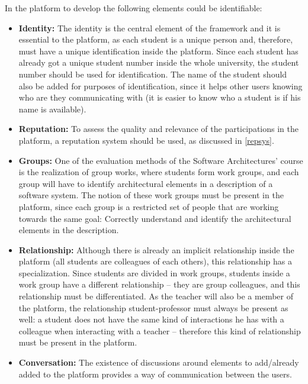 In the platform to develop the following elements could be identifiable:

\begin{itemize}
\item \textbf{Identity:} The identity is the central element of the framework and it is essential to the platform, as each student is a unique person and, therefore, must have a unique identification inside the platform. Since each student has already got a unique student number inside the whole university, the student number should be used for identification. The name of the student should also be added for purposes of identification, since it helps other users knowing who are they communicating with (it is easier to know who a student is if his name is available).

\item \textbf{Reputation:} To assess the quality and relevance of the participations in the platform, a reputation system should be used, as discussed in \ref{repsys}.

\item \textbf{Groups:} One of the evaluation methods of the Software Architectures' course is the realization of group works, where students form work groups, and each group will have to identify architectural elements in a description of a software system. The notion of these work groups must be present in the platform, since each group is a restricted set of people that are working towards the same goal: Correctly understand and identify the architectural elements in the description. 

\item \textbf{Relationship:} Although there is already an implicit relationship inside the platform (all students are colleagues of each others), this relationship has a specialization. Since students are divided in work groups, students inside a work group have a different relationship – they are group colleagues, and this relationship must be differentiated. As the teacher will also be a member of the platform, the relationship student-professor must always be present as well: a student does not have the same kind of interactions he has with a colleague when interacting with a teacher – therefore this kind of relationship must be present in the platform.

\item \textbf{Conversation:} The existence of discussions around elements to add/already added to the platform provides a way of communication between the users.


\end{itemize}
